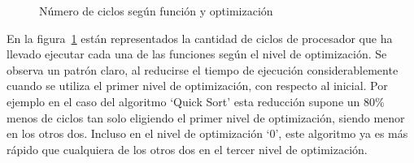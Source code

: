 \begin{figure}[htbp]
\begin{center}
\end{center}
\caption{Número de ciclos según función y optimización}
\label{graph:ciclos}
\end{figure}

En la figura~\ref{graph:ciclos} están representados la cantidad de ciclos de procesador que ha llevado ejecutar cada una de las funciones según el nivel de optimización. Se observa un patrón claro, al reducirse el tiempo de ejecución considerablemente cuando se utiliza el primer nivel de optimización, con respecto al inicial. Por ejemplo en el caso del algoritmo `Quick Sort' esta reducción supone un 80\% menos de ciclos tan solo eligiendo el primer nivel de optimización, siendo menor en los otros dos. Incluso en el nivel de optimización `0', este algoritmo ya es más rápido que cualquiera de los otros dos en el tercer nivel de optimización.

